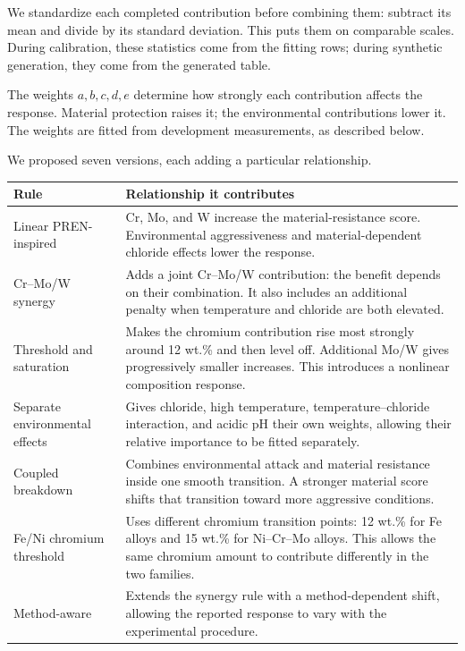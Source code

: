 \documentclass[11pt]{article}
\begin{document}
We standardize each completed contribution before combining them: subtract its mean and
divide by its standard deviation. This puts them on comparable scales. During calibration,
these statistics come from the fitting rows; during synthetic generation, they come from the
generated table.

The weights \(a,b,c,d,e\) determine how strongly each contribution affects the response.
Material protection raises it; the environmental contributions lower it. The weights are
fitted from development measurements, as described below.

We proposed seven versions, each adding a particular relationship.

\begingroup
\setlength{\extrarowheight}{2pt}
\begin{longtable}{@{}>{\raggedright\arraybackslash}p{}>{\raggedright\arraybackslash}p{}@{}}
\hline
\textbf{Rule} & \textbf{Relationship it contributes} \\[0.45em]
\hline
Linear PREN-inspired & Cr, Mo, and W increase the material-resistance score. Environmental aggressiveness and material-dependent chloride effects lower the response. \\[0.45em]
Cr–Mo/W synergy & Adds a joint Cr–Mo/W contribution: the benefit depends on their combination. It also includes an additional penalty when temperature and chloride are both elevated. \\[0.45em]
Threshold and saturation & Makes the chromium contribution rise most strongly around 12 wt.\% and then level off. Additional Mo/W gives progressively smaller increases. This introduces a nonlinear composition response. \\[0.45em]
Separate environmental effects & Gives chloride, high temperature, temperature–chloride interaction, and acidic pH their own weights, allowing their relative importance to be fitted separately. \\[0.45em]
Coupled breakdown & Combines environmental attack and material resistance inside one smooth transition. A stronger material score shifts that transition toward more aggressive conditions. \\[0.45em]
Fe/Ni chromium threshold & Uses different chromium transition points: 12 wt.\% for Fe alloys and 15 wt.\% for Ni–Cr–Mo alloys. This allows the same chromium amount to contribute differently in the two families. \\[0.45em]
Method-aware & Extends the synergy rule with a method-dependent shift, allowing the reported response to vary with the experimental procedure. \\[0.45em]
\hline
\end{longtable}
\endgroup
\end{document}
